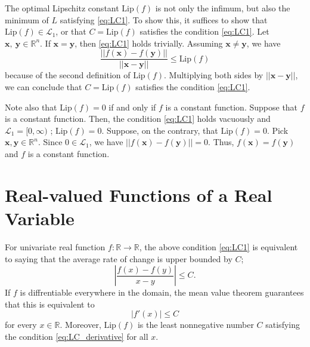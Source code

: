 \documentclass[12pt]{report}
\numberwithin{figure}{chapter}
\theoremstyle{plain}
\theoremstyle{definition}
\theoremstyle{corollary}
\theoremstyle{definition}
\theoremstyle{plain}
\theoremstyle{definition}
\theoremstyle{plain}
\newcommand\bx{\ensuremath{\boldsymbol x}}
\newcommand\by{\ensuremath{\boldsymbol y}}
\newcommand\lip{\ensuremath{\text{Lip}}}
\begin{document}
The optimal Lipschitz constant \(\lip(f)\) is not only the infimum, but also the minimum of \(L\) satisfying \eqref{eq:LC1}.
To show this, it suffices to show that \(\lip(f)\in\mathcal L_1\), or that \(C=\lip(f)\) satisfies the condition \eqref{eq:LC1}.
Let \(\bx,\:\by\in\mathbb R^n\).
If \(\bx=\by\), then \eqref{eq:LC1} holds trivially.
Assuming \(\bx\neq\by\), we have
\[
\frac{||f(\bx)-f(\by)||}{||\bx-\by||}\le\lip(f)
\]
because of the second definition of \(\lip(f)\).
Multiplying both sides by \(||\bx-\by||\), we can conclude that \(C=\lip(f)\) satisfies the condition \eqref{eq:LC1}.

Note also that \(\lip(f)=0\) if and only if \(f\) is a constant function.
Suppose that \(f\) is a constant function.
Then, the condition \eqref{eq:LC1} holds vacuously and \(\mathcal L_1=[0,\infty)\) ; \(\lip(f)=0\).
Suppose, on the contrary, that \(\lip(f)=0\).
Pick \(\bx,\by\in\mathbb R^n\).
Since \(0\in\mathcal L_1\), we have \(||f(\bx)-f(\by)||=0\).
Thus, \(f(\bx)=f(\by)\) and \(f\) is a constant function.

\section{Real-valued Functions of a Real Variable}

For univariate real function \(f:\mathbb R\to\mathbb R\), the above condition \eqref{eq:LC1} is equivalent to saying that the average rate of change is upper bounded by \(C\);
\begin{equation}\label{eq:LC_average_rate_of_change}
\left|\frac{f(x)-f(y)}{x-y}\right|\le C.
\end{equation}
If \(f\) is diffrentiable everywhere in the domain, the mean value theorem guarantees that this is equivalent to 
\begin{equation}\label{eq:LC_derivative}
|f'(x)|\le C
\end{equation}
for every \(x\in\mathbb R\).
Moreover, \(\lip(f)\) is the least nonnegative number \(C\) satisfying the condition \eqref{eq:LC_derivative} for all \(x\).
\end{document}
